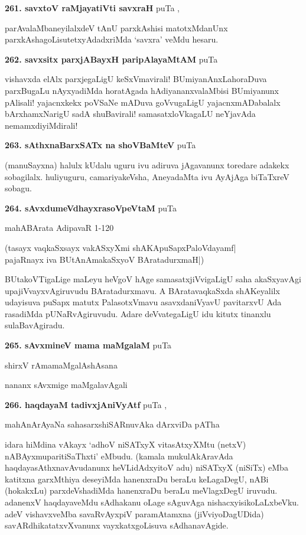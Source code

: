 \medskip
\noindent\textbf{261. savxtoV raMjayatiVti savxraH} \hfill puTa \pageref{11},\pageref{17a}

\hfill parAvalaMbaneyilalxdeV tAnU parxkAshisi matotxMdanUnx parxkAshagoLisutetxyAdadxriMda `savxra' veMdu hesaru.

\medskip
\noindent\textbf{262. savxsitx parxjABayxH paripAlayaMtAM} \hfill puTa \pageref{149b}

\hfill vishavxda elAlx parxjegaLigU keSxVmavirali! BUmiyanAnxLahoraDuva parxBugaLu nAyxyadiMda horatAgada hAdiyananxvalaMbisi BUmiyanunx pAlisali! yajacnxkekx poVSaNe mADuva goVvugaLigU yajacnxmADabalalx bArxhamxNarigU sadA shuBavirali! samasatxloVkagaLU neYjavAda nemamxdiyiMdirali!

\medskip
\noindent\textbf{263. sAthxnaBarxSATx na shoVBaMteV} \hfill puTa \pageref{48d}

\hfill (manuSayxna) halulx kUdalu uguru ivu adiruva jAgavanunx toredare adakekx sobagilalx. huliyuguru, camariyakeVsha, AneyadaMta ivu AyAjAga biTaTxreV sobagu.

\medskip
\noindent\textbf{264. sAvxdumeVdhayxrasoVpeVtaM} \hfill puTa \pageref{119d}

\hfill mahABArata AdipavaR 1-120

\begin{shloka}
(tasayx vaqkaSxsayx vakASxyXmi shAKApuSapxPaloVdayamf|\\
pajaRnayx iva BUtAnAmakaSxyoV BAratadurxmaH|)
\end{shloka}

BUtakoVTigaLige maLeyu heVgoV hAge samasatxjiVvigaLigU saha akaSxyavAgi upajiVvayxvAgiruvudu BAratadurxmavu. A BAratavaqkaSxda shAKeyalilx udayisuva puSapx matutx PalasotxVmavu asavxdaniVyavU pavitarxvU Ada rasadiMda pUNaRvAgiruvudu. Adare deVvategaLigU idu kitutx tinanxlu sulaBavAgiradu.

\medskip
\noindent\textbf{265. sAvxmineV mama maMgalaM} \hfill puTa \pageref{234}

\hfill shirxV rAmamaMgalAshAsana

nananx sAvxmige maMgalavAgali

\medskip
\noindent\textbf{266. haqdayaM tadivxjAniVyAtf} \hfill puTa \pageref{27a},\pageref{249e}

\hfill mahAnArAyaNa sahasarxshiSARnuvAka dArxviDa pATha

idara hiMdina vAkayx `adhoV niSATxyX vitasAtxyXMtu (netxV) nABAyxmuparitiSaThxti' eMbudu. (kamala mukulAkAravAda haqdayasAthxnavAvudanunx heVLidAdxyitoV adu) niSATxyX (niSiTx) eMba katitxna garxMthiya deseyiMda hanenxraDu beraLu keLagaDegU, nABi (hokakxLu) parxdeVshadiMda hanenxraDu beraLu meVlagxDegU iruvudu. adanenxV haqdayaveMdu sAdhakanu oLage sAguvAga nishacxyisikoLaLxbeVku. adeV vishavxveMba savaRvAyxpiV paramAtamxna (jiVviyoDagUDida) savARdhikatatxvXvanunx vayxkatxgoLisuva sAdhanavAgide.

